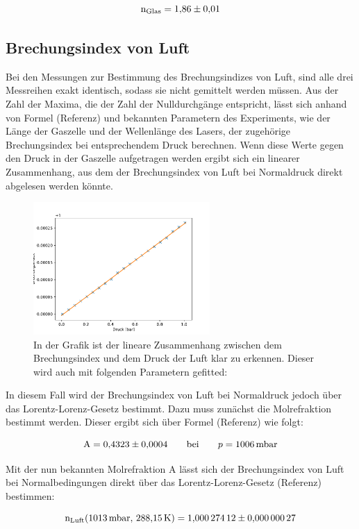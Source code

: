         \begin{equation}
            \text{n}_{\text{Glas}} = \num{1.86 +- 0.01}
        \end{equation}


    \subsection{Brechungsindex von Luft}
        Bei den Messungen zur Bestimmung des Brechungsindizes von Luft, sind alle drei Messreihen exakt identisch, sodass sie nicht gemittelt werden müssen. Aus der Zahl der Maxima, die der Zahl der 
        Nulldurchgänge entspricht, lässt sich anhand von Formel (Referenz) und bekannten Parametern des Experiments, wie der Länge der Gaszelle und der Wellenlänge des Lasers, der zugehörige Brechungsindex
        bei entsprechendem Druck berechnen. Wenn diese Werte gegen den Druck in der Gaszelle aufgetragen werden ergibt sich ein linearer Zusammenhang, aus dem der Brechungsindex von Luft bei Normaldruck direkt 
        abgelesen werden könnte.

        \FloatBarrier

        \begin{figure}[h]
          \centering
          \includegraphics[width = 0.6\textwidth]{pictures/druck_lin.pdf}
          \caption{In der Grafik ist der lineare Zusammenhang zwischen dem Brechungsindex und dem Druck der Luft klar zu erkennen. Dieser wird auch mit folgenden Parametern gefitted: }
          \label{fig:Aufbau}
        \end{figure}

        \FloatBarrier

        In diesem Fall wird der Brechungsindex von Luft bei Normaldruck jedoch über das Lorentz-Lorenz-Gesetz bestimmt. Dazu muss zunächst die Molrefraktion bestimmt werden. Dieser ergibt sich
        über Formel (Referenz) wie folgt:

        \begin{equation}
            \text{A} = \num{0.4323 +- 0.0004} \qquad \text{bei} \qquad p = \SI{1006}{\milli\bar} 
        \end{equation}

        Mit der nun bekannten Molrefraktion A lässt sich der Brechungsindex von Luft bei Normalbedingungen direkt über das Lorentz-Lorenz-Gesetz (Referenz) bestimmen:

        \begin{equation}
            \text{n}_{\text{Luft}}(\SI{1013}{\milli\bar}, \, \SI{288.15}{\kelvin}) = \num{1.00027412 +- 0.00000027}     
        \end{equation}
        
